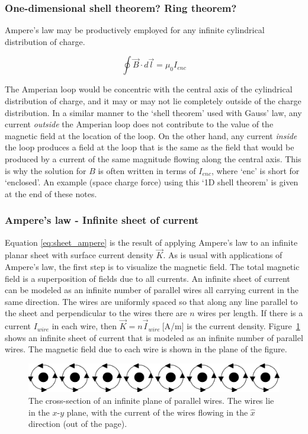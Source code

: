 \documentclass[12pt]{article}
\begin{document}
\begin{flushleft}
\subsubsection*{\bf One-dimensional shell theorem?  Ring theorem?}

Ampere's law may be productively employed for any infinite cylindrical distribution of charge.  

\[
\oint \vec{B} \cdot d\vec{l} = \mu_{0}I_{enc} 
\]

The Amperian loop would be concentric with the central axis of the cylindrical distribution of charge, and it may or may not lie completely outside of the charge distribution.  In a similar manner to the `shell theorem' used with Gauss' law, any current {\it outside} the Amperian loop does not contribute to the value of the magnetic field at the location of the loop.  On the other hand, any current {\it inside} the loop produces a field at the loop that is the same as the field that would be produced by a current of the same magnitude flowing along the central axis.  This is why the solution for $B$ is often written in terms of $I_{enc}$, where `enc' is short for `enclosed'.   An example (space charge force) using this `1D shell theorem' is given at the end of these notes.

\subsubsection*{\bf Ampere's law - Infinite sheet of current}

Equation \ref{eq:sheet_ampere} is the result of applying Ampere's law to an infinite planar sheet with surface current density $\vec{K}$.  As is usual with applications of Ampere's law, the first step is to visualize the magnetic field.  The total magnetic field is a superposition of fields due to all currents.  An infinite sheet of current can be modeled as an infinite number of parallel wires all carrying current in the same direction.  The wires are uniformly spaced so that along any line parallel to the sheet and perpendicular to the wires there are $n$ wires per length.  If there is a current $I_{wire}$ in each wire, then $\vec{K}=n\vec{I}_{wire}\:$[A/m] is the current density.   Figure~\ref{fig:wiresheet} shows an infinite sheet of current that is modeled as an infinite number of parallel wires.  The magnetic field due to each wire is shown in the plane of the figure.
\vspace{.2in}

\begin{figure}[h]
\centering
\includegraphics*[trim=0cm 0cm 0cm 0cm, clip=true, width=0.6\columnwidth]{Isheet.pdf}
\caption{\small The cross-section of an infinite plane of parallel wires.  The wires lie in the $x$-$y$ plane, with the current of the wires flowing in the $\hat{x}$ direction (out of the page).}
\label{fig:wiresheet}
\end{figure}


\end{flushleft}
\end{document}
